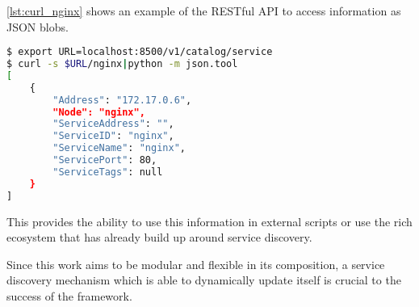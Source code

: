 \autoref{lst:curl_nginx} shows an example of the RESTful API to access information as JSON blobs.

\begin{lstlisting}[language=bash,
    caption={Example of service exposure via RESTful API.},
    label={lst:curl_nginx}]
$ export URL=localhost:8500/v1/catalog/service
$ curl -s $URL/nginx|python -m json.tool
[
    {
        "Address": "172.17.0.6",
        "Node": "nginx",
        "ServiceAddress": "",
        "ServiceID": "nginx",
        "ServiceName": "nginx",
        "ServicePort": 80,
        "ServiceTags": null
    }
]
\end{lstlisting}
This provides the ability to use this information in external scripts or use the rich ecosystem that has already build up around service discovery.

Since this work aims to be modular and flexible in its composition, a service discovery mechanism which is able to dynamically update itself is crucial to the success of the framework.
